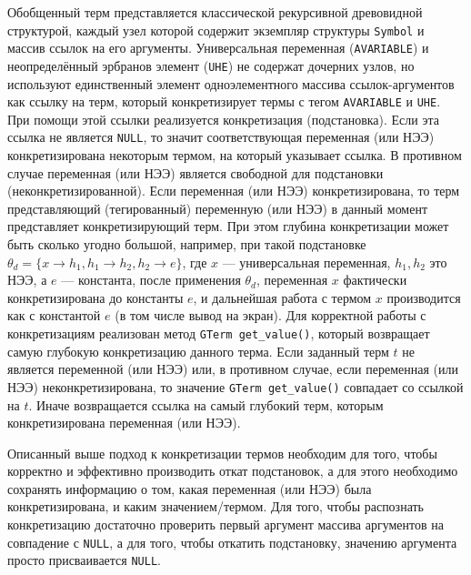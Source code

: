 Обобщенный терм представляется классической рекурсивной древовидной структурой, каждый узел которой содержит экземпляр структуры \texttt{Symbol} и массив ссылок на его аргументы. Универсальная переменная (\texttt{AVARIABLE}) и неопределённый эрбранов элемент (\texttt{UHE}) не содержат дочерних узлов, но используют единственный элемент одноэлементного массива ссылок-ар\-гу\-мен\-тов как ссылку на терм, который конкретизирует термы с тегом \texttt{AVARIABLE} и \texttt{UHE}. При помощи этой ссылки реализуется конкретизация (подстановка). Если эта ссылка не является \texttt{NULL}, то значит соответствующая переменная (или НЭЭ) конкретизирована некоторым термом, на который указывает ссылка. В противном случае переменная (или НЭЭ) является свободной для подстановки (неконкретизированной). Если переменная (или НЭЭ) конкретизирована, то терм представляющий (тегированный) переменную (или НЭЭ) в данный момент представляет конкретизирующий терм. При этом глубина конкретизации может быть сколько угодно большой, например, при такой подстановке ${\theta}_d = \{x \rightarrow h_1, h_1 \rightarrow h_2, h_2 \rightarrow e \}$, где $x$ --- универсальная переменная, $h_1, h_2$ это НЭЭ, а $e$ --- константа, после применения ${\theta}_d$, переменная $x$ фактически конкретизирована до константы $e$, и дальнейшая работа с термом $x$ производится как с константой $e$ (в том числе вывод на экран). Для корректной работы с конкретизациям реализован метод {\tt GTerm get\_value()}, который возвращает самую глубокую конкретизацию данного терма. Если заданный терм $t$ не является переменной (или НЭЭ) или, в противном случае, если переменная (или НЭЭ) неконкретизирована, то значение \texttt{GTerm get\_value()} совпадает со ссылкой на $t$. Иначе возвращается ссылка на самый глубокий терм, которым конкретизирована переменная (или НЭЭ).

Описанный выше подход к конкретизации термов необходим для того, чтобы корректно и эффективно производить откат подстановок, а для этого необходимо сохранять информацию о том, какая переменная (или НЭЭ) была конкретизирована, и каким значением/термом. Для того, чтобы распознать конкретизацию достаточно проверить первый аргумент массива аргументов на совпадение с \texttt{NULL}, а для того, чтобы откатить подстановку, значению аргумента просто присваивается \texttt{NULL}.

